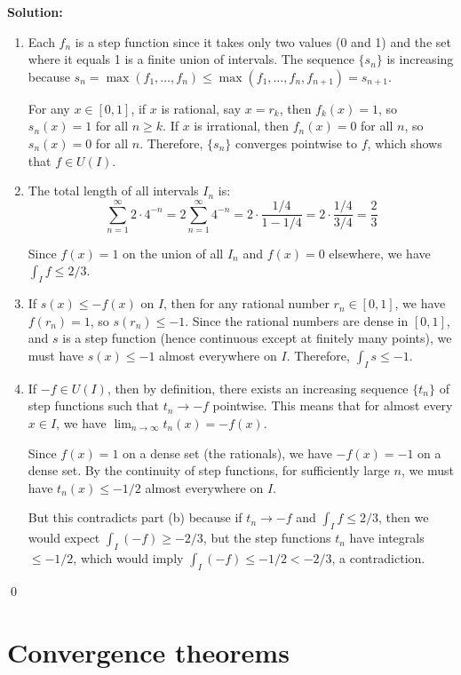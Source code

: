 \bigskip\noindent\textbf{Solution:}
\begin{enumerate}[label=(\alph*)]
    \item Each $f_n$ is a step function since it takes only two values (0 and 1) and the set where it equals 1 is a finite union of intervals. The sequence $\{s_n\}$ is increasing because $s_n = \max(f_1, \ldots, f_n) \leq \max(f_1, \ldots, f_n, f_{n+1}) = s_{n+1}$.

    For any $x \in [0, 1]$, if $x$ is rational, say $x = r_k$, then $f_k(x) = 1$, so $s_n(x) = 1$ for all $n \geq k$. If $x$ is irrational, then $f_n(x) = 0$ for all $n$, so $s_n(x) = 0$ for all $n$. Therefore, $\{s_n\}$ converges pointwise to $f$, which shows that $f \in U(I)$.

    \item The total length of all intervals $I_n$ is:
    \[\sum_{n=1}^{\infty} 2 \cdot 4^{-n} = 2 \sum_{n=1}^{\infty} 4^{-n} = 2 \cdot \frac{1/4}{1 - 1/4} = 2 \cdot \frac{1/4}{3/4} = \frac{2}{3}\]
    
    Since $f(x) = 1$ on the union of all $I_n$ and $f(x) = 0$ elsewhere, we have $\int_I f \leq 2/3$.

    \item If $s(x) \leq -f(x)$ on $I$, then for any rational number $r_n \in [0, 1]$, we have $f(r_n) = 1$, so $s(r_n) \leq -1$. Since the rational numbers are dense in $[0, 1]$, and $s$ is a step function (hence continuous except at finitely many points), we must have $s(x) \leq -1$ almost everywhere on $I$. Therefore, $\int_I s \leq -1$.

    \item If $-f \in U(I)$, then by definition, there exists an increasing sequence $\{t_n\}$ of step functions such that $t_n \to -f$ pointwise. This means that for almost every $x \in I$, we have $\lim_{n \to \infty} t_n(x) = -f(x)$.

    Since $f(x) = 1$ on a dense set (the rationals), we have $-f(x) = -1$ on a dense set. By the continuity of step functions, for sufficiently large $n$, we must have $t_n(x) \leq -1/2$ almost everywhere on $I$.

    But this contradicts part (b) because if $t_n \to -f$ and $\int_I f \leq 2/3$, then we would expect $\int_I (-f) \geq -2/3$, but the step functions $t_n$ have integrals $\leq -1/2$, which would imply $\int_I (-f) \leq -1/2 < -2/3$, a contradiction.
\end{enumerate}\qed
\section{Convergence theorems}

